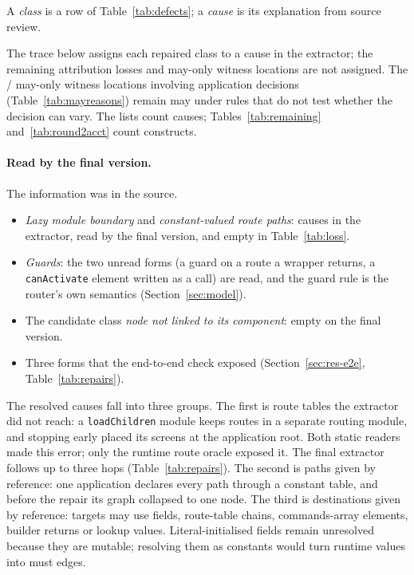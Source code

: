 A \emph{class} is a row of Table~\ref{tab:defects}; a \emph{cause} is its explanation from source review.

The trace below assigns each repaired class to a cause in the extractor; the remaining attribution
losses and may-only witness locations are not assigned. The \MayAppAny{}/\MayOnlyConstructs{} may-only witness locations involving
application decisions (Table~\ref{tab:mayreasons}) remain may under rules that do not test whether
the decision can vary. The lists count causes; Tables~\ref{tab:remaining} and~\ref{tab:round2acct} count constructs.

\paragraph{Read by the final version.} The information was in the source.

\begin{itemize}
\item \emph{Lazy module boundary} and \emph{constant-valued route paths}: causes in the extractor,
read by the final version, and empty in Table~\ref{tab:loss}.
\item \emph{Guards}: the two unread forms (a guard on a route a wrapper returns, a
\texttt{canActivate} element written as a call) are read, and the guard rule is the router's own
semantics (Section~\ref{sec:model}).
\item The candidate class \emph{node not linked to its component}: empty on the final version.
\item Three forms that the end-to-end check exposed (Section~\ref{sec:res-e2e}, Table~\ref{tab:repairs}).
\end{itemize}

The resolved causes fall into three groups. The first is route tables the extractor did not reach: a \texttt{loadChildren} module
keeps routes in a separate routing module, and stopping early placed its screens at the application root.
Both static readers made this error; only the runtime route oracle exposed it. The final extractor
follows up to three hops (Table~\ref{tab:repairs}). The second is paths given by reference: one application declares
every path through a constant table, and before the repair its graph collapsed to one node.
The third is destinations given by reference: targets may use fields, route-table chains, commands-array
elements, builder returns or lookup values. Literal-initialised fields remain unresolved because
they are mutable; resolving them as constants would turn runtime values into must edges.

